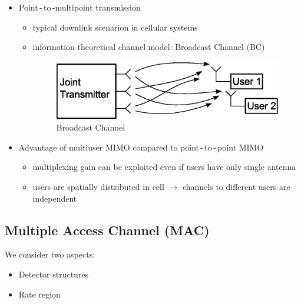 \documentclass[a4paper, 10pt]{article}
\begin{document}
\begin{itemize}
\begin{itemize}
	\end{itemize}
	\item Point\,-\,to\,-multipoint transmission
	\begin{itemize}
		\item typical downlink scenarion in cellular systems
		\item information theoretical channel model: Broadcast Channel (BC)
		\begin{figure}[h]
			\centering
			\includegraphics[scale=0.8]{BC}
			\caption{Broadcast Channel}		
			\label{fig:BC}
		\end{figure}	
	\end{itemize}
	\item Advantage of multiuser MIMO compared to point\,-\,to\,-\,point MIMO
	\begin{itemize}
		\item multiplexing gain can be exploited even if users have only single antenna
		\item users are spatially distributed in cell $\rightarrow $ channels to different users are independent
	\end{itemize}
\end{itemize}
\subsection{Multiple Access Channel (MAC)}
We consider two aspects:
\begin{itemize}
	\item Detector structures
	\item Rate region
\end{itemize}
\end{document}
